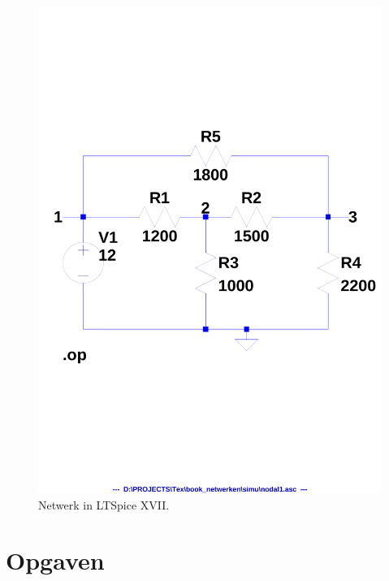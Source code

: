 \begin{figure}[!ht]
\centering
\includegraphics[scale=0.3]{images/nodal1}
\caption{Netwerk in LTSpice XVII.}
\label{fig:gelnetwerkltspice}
\end{figure}



\ifopgaven
\section{Opgaven}

\fi
